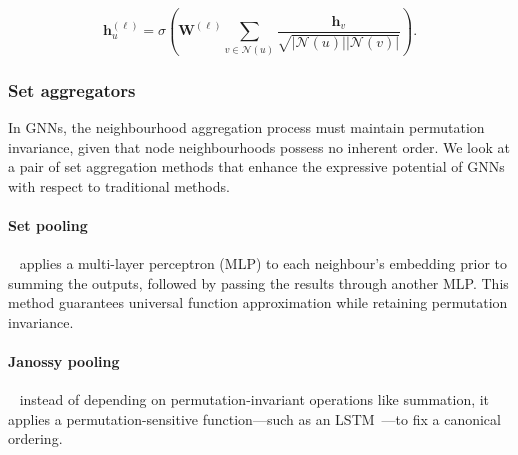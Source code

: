 \begin{equation*}
    \mathbf{h}_u^{(\ell)} = \sigma\left(\mathbf{W}^{(\ell)}\sum_{v \in \mathcal{N}(u)}\frac{ \mathbf{h}_v}{\sqrt{|\mathcal{N}(u)||\mathcal{N}(v)|}}\right).
\end{equation*}

\subsubsection{Set aggregators}
In GNNs, the neighbourhood aggregation process must maintain permutation invariance, given that node neighbourhoods possess no inherent order. We look at a pair of set aggregation methods that enhance the expressive potential of GNNs with respect to traditional methods. 

\paragraph{Set pooling}~\cite{zaheer2017deepSets} applies a multi-layer perceptron (MLP) to each neighbour’s embedding prior to summing the outputs, followed by passing the results through another MLP. This method guarantees universal function approximation while retaining permutation invariance. 

\paragraph{Janossy pooling}~\cite{murphy2018janossyPooling} instead of depending on permutation-invariant operations like summation, it applies a permutation-sensitive function—such as an LSTM~\cite{hochreiter1997LSTM}—to fix a canonical ordering.

